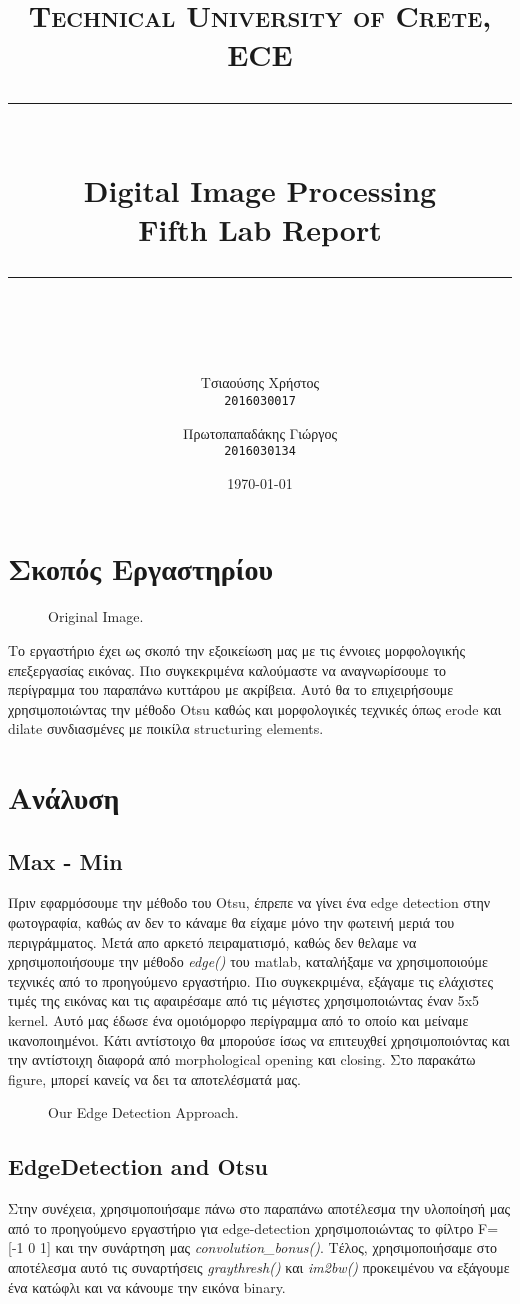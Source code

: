 \documentclass[11pt]{scrartcl} %
\title{
	\normalfont\normalsize
	\textsc{Technical University of Crete, ECE}\\ %
	\vspace{25pt} %
	\rule{\linewidth}{0.5pt}\\ %
	\vspace{20pt} %
	{\Huge Digital Image Processing}\\ %

	{\huge Fifth Lab Report}\\ %
	\vspace{12pt} %
	\rule{\linewidth}{2pt}\\ %
	\vspace{12pt} %
}
\author{\LARGE{Τσιαούσης Χρήστος}\\
		\texttt{2016030017}
		\and
		\LARGE{Πρωτοπαπαδάκης Γιώργος}\\
		\texttt{2016030134}}%
\date{\normalsize\today} %
\begin{document}
\maketitle %

\section{Σκοπός Εργαστηρίου}

\begin{figure}[h]
    \centering
    \caption{Original Image.}
\end{figure}

Το εργαστήριο έχει ως σκοπό την εξοικείωση μας με τις έννοιες μορφολογικής επεξεργασίας εικόνας. Πιο συγκεκριμένα καλούμαστε
να αναγνωρίσουμε το περίγραμμα του παραπάνω κυττάρου με ακρίβεια. Αυτό θα το επιχειρήσουμε χρησιμοποιώντας την μέθοδο Otsu
καθώς και μορφολογικές τεχνικές όπως erode και dilate συνδιασμένες με ποικίλα structuring elements.

\section{Ανάλυση}

\subsection{Max - Min}
Πριν εφαρμόσουμε την μέθοδο του Otsu, έπρεπε να γίνει ένα edge detection στην φωτογραφία, καθώς αν δεν το κάναμε θα είχαμε
μόνο την φωτεινή μεριά του περιγράμματος. Μετά απο αρκετό πειραματισμό, καθώς δεν θελαμε να χρησιμοποιήσουμε την μέθοδο
\textit{edge()} του matlab, καταλήξαμε να χρησιμοποιούμε τεχνικές από το προηγούμενο εργαστήριο. Πιο συγκεκριμένα, εξάγαμε
τις ελάχιστες τιμές της εικόνας και τις αφαιρέσαμε από τις μέγιστες χρησιμοποιώντας έναν 5x5 kernel. Αυτό μας έδωσε ένα
ομοιόμορφο περίγραμμα από το οποίο και μείναμε ικανοποιημένοι. Κάτι αντίστοιχο θα μπορούσε ίσως να επιτευχθεί χρησιμοποιόντας
και την αντίστοιχη διαφορά από morphological opening και closing. Στο παρακάτω figure, μπορεί κανείς να δει τα αποτελέσματά μας.

\begin{figure}[h]
    \centering
    \caption{Our Edge Detection Approach.}
\end{figure}
\clearpage

\subsection{EdgeDetection and Otsu}
Στην συνέχεια, χρησιμοποιήσαμε πάνω στο παραπάνω αποτέλεσμα την υλοποίησή μας από το προηγούμενο εργαστήριο για
edge-detection χρησιμοποιώντας το φίλτρο F=[-1 0 1] και την συνάρτηση μας \textit{convolution\_bonus()}. Τέλος,
χρησιμοποιήσαμε στο αποτέλεσμα αυτό τις συναρτήσεις \textit{graythresh()} και \textit{im2bw()} προκειμένου
να εξάγουμε ένα κατώφλι και να κάνουμε την εικόνα binary.
\end{document}
